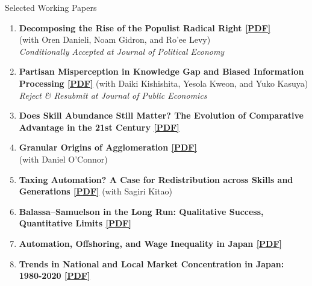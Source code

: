 \documentclass{resume} %
\begin{document}
\begin{rSection}{Selected Working Papers}
\begin{enumerate}
    \item \textbf{Decomposing the Rise of the Populist Radical Right 
    \href{https://www.shinnosuke-kikuchi.com/files/research/DGKL-Populism.pdf}{[PDF]}}\\
    (with Oren Danieli, Noam Gidron, and Ro’ee Levy) \\
    \textit{Conditionally Accepted at Journal of Political Economy} 
    \item \textbf{Partisan Misperception in Knowledge Gap and Biased Information Processing \href{https://www.shinnosuke-kikuchi.com/files/research/KKKK-partisan-disbelief.pdf}{[PDF]}} 
    (with Daiki Kishishita, Yesola Kweon, and Yuko Kasuya) \\ \textit{Reject \& Resubmit at Journal of Public Economics}
    \item \textbf{Does Skill Abundance Still Matter? The Evolution of Comparative Advantage in the 21st Century \href{https://www.shinnosuke-kikuchi.com/files/research/KIKUCHI-skill-trade.pdf}{[PDF]}}
    \item \textbf{Granular Origins of Agglomeration
    \href{https://www.shinnosuke-kikuchi.com/files/research/KIKUCHI-OCONNOR-granular-spatial.pdf}{[PDF]}} \\
    (with Daniel O'Connor)
     \item \textbf{Taxing Automation? A Case for Redistribution across Skills and Generations
     \href{https://www.shinnosuke-kikuchi.com/files/research/KK-ROBOT.pdf}{[PDF]}}
    (with Sagiri Kitao)
     \item \textbf{Balassa–Samuelson in the Long Run: Qualitative Success, Quantitative Limits  \href{https://www.shinnosuke-kikuchi.com/files/research/KIKUCHI-BS.pdf}{[PDF]}}
      \item \textbf{Automation, Offshoring, and Wage Inequality in Japan
    \href{https://www.shinnosuke-kikuchi.com/files/research/KIKUCHI_JPN_techtrade_ineq.pdf}{[PDF]}} 
     \item \textbf{Trends in National and Local Market Concentration in Japan: 1980-2020
    \href{https://www.shinnosuke-kikuchi.com/files/research/KIKUCHI_JPN_concentration.pdf}{[PDF]}}
\end{enumerate}
\end{rSection}
\end{document}
